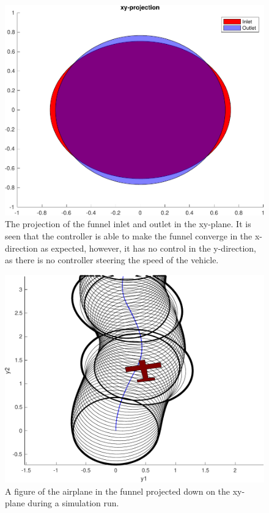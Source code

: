 \begin{figure}[!t]
  \centering
  \includegraphics[width=.8\columnwidth]{figures/experiments/funnel-inlet-outlet}
  \caption[The projection of the funnel inlet and outlet in the xy-plane]{The projection of the funnel inlet and outlet in the xy-plane. It is
    seen that the controller is able to make the funnel converge in the
    x-direction as expected, however, it has no control in the y-direction, as
    there is no controller steering the speed of the vehicle.}
  \label{fig:funnel-inlet-outlet}
\end{figure}

\begin{figure}[!t]
  \centering
  \includegraphics[width=.8\columnwidth]{figures/experiments/airplane-in-funnel} \caption[A
  figure of the airplane in the funnel]{A figure of the airplane in the funnel
  projected down on the xy-plane during a simulation run.}
\label{fig:airplane-in-funnel}
\end{figure}


